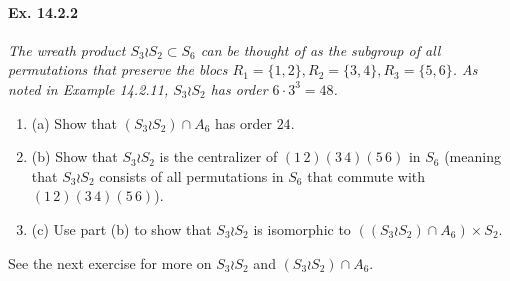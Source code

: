 \documentclass[11pt,a4paper]{article}
\newcommand{\be} {\begin{enumerate}}
\newcommand{\ee} {\end{enumerate}}
\begin{document}
\paragraph{Ex. 14.2.2}
{\it The wreath product $S_3 \wr S_2 \subset S_6$ can be thought of as the subgroup of all permutations that preserve the blocs $R_1 = \{1,2\}, R_2 = \{3,4\},R_3 = \{5,6\}$. As noted in Example 14.2.11, $S_3 \wr S_2$ has order $6\cdot3^3 = 48$.
\be
\item[(a)] Show that $(S_3 \wr S_2) \cap A_6$ has order $24$.
\item[(b)] Show that $S_3 \wr S_2$ is the centralizer of $(1\,2)(3\,4)(5\,6)$ in $S_6$ (meaning that $S_3 \wr S_2$ consists of all permutations in $S_6$ that commute with $(1\,2)(3\,4)(5\,6)$).
\item[(c)] Use part (b) to show that $S_3 \wr S_2$ is isomorphic to $((S_3 \wr S_2) \cap A_6) \times S_2$.
\ee
See the next exercise for more on $S_3 \wr S_2$ and $(S_3 \wr S_2) \cap A_6$.
}
\end{document}

